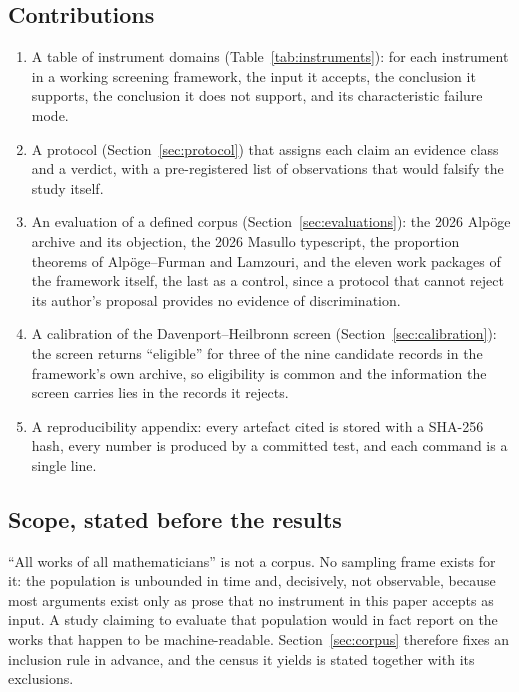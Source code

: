 \documentclass[11pt,a4paper]{article}
\begin{document}
\subsection{Contributions}

\begin{enumerate}
\item A table of instrument domains (Table~\ref{tab:instruments}): for each instrument in a
  working screening framework, the input it accepts, the conclusion it supports, the conclusion
  it does not support, and its characteristic failure mode.
\item A protocol (Section~\ref{sec:protocol}) that assigns each claim an evidence class and a
  verdict, with a pre-registered list of observations that would falsify the study itself.
\item An evaluation of a defined corpus (Section~\ref{sec:evaluations}): the 2026 Alp\"oge
  archive and its objection, the 2026 Masullo typescript, the proportion theorems of
  Alp\"oge--Furman and Lamzouri, and the eleven work packages of the framework itself, the last
  as a control, since a protocol that cannot reject its author's proposal provides no evidence of
  discrimination.
\item A calibration of the Davenport--Heilbronn screen (Section~\ref{sec:calibration}): the
  screen returns ``eligible'' for three of the nine candidate records in the framework's own
  archive, so eligibility is common and the information the screen carries lies in the records
  it rejects.
\item A reproducibility appendix: every artefact cited is stored with a SHA-256 hash, every
  number is produced by a committed test, and each command is a single line.
\end{enumerate}

\subsection{Scope, stated before the results}

``All works of all mathematicians'' is not a corpus. No sampling frame exists for it:
the population is unbounded in time and, decisively, not observable, because most arguments exist
only as prose that no instrument in this paper accepts as input. A study claiming to evaluate that
population would in fact report on the works that happen to be machine-readable.
Section~\ref{sec:corpus} therefore fixes an inclusion rule in advance, and the census it yields is
stated together with its exclusions.
\end{document}
